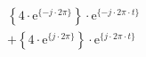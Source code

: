 \[
\begin{split}
&  \left \{ 4 \cdot \textrm{e}^{\{ -j \cdot 2\pi \}} \right \} \cdot \textrm{e}^{\{- j \cdot 2\pi \cdot t \}}\\
&+ \left \{ 4 \cdot \textrm{e}^{\{  j \cdot 2\pi \}} \right \} \cdot \textrm{e}^{\{  j \cdot 2\pi \cdot t \}}
\end{split}
\]
